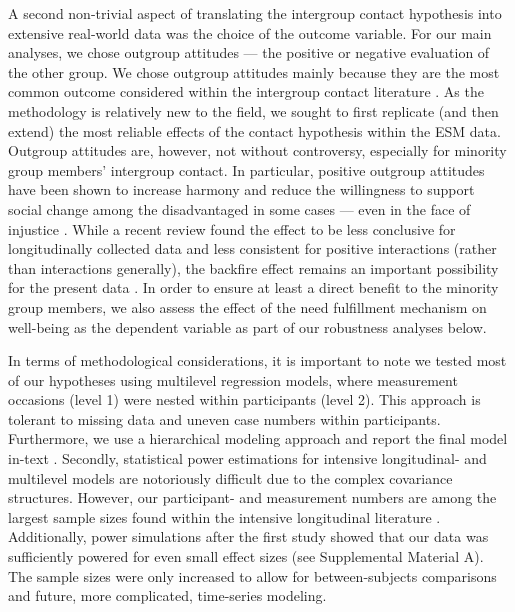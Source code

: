 \documentclass[man, 12pt, a4paper, mask]{apa7}
\theoremstyle{break}
\theoremstyle{plain}
\begin{document}
A second non-trivial aspect of translating the intergroup contact hypothesis into extensive real-world data was the choice of the outcome variable. For our main analyses, we chose outgroup attitudes --- the positive or negative evaluation of the other group. We chose outgroup attitudes mainly because they are the most common outcome considered within the intergroup contact literature \citep[e.g.,][]{Pettigrew2006, Paolini2021}. As the methodology is relatively new to the field, we sought to first replicate (and then extend) the most reliable effects of the contact hypothesis within the ESM data. Outgroup attitudes are, however, not without controversy, especially for minority group members' intergroup contact. In particular, positive outgroup attitudes have been shown to increase harmony and reduce the willingness to support social change among the disadvantaged in some cases --- even in the face of injustice \citep[e.g.,][]{dixon2012, saguy2009}. While a recent review found the effect to be less conclusive for longitudinally collected data and less consistent for positive interactions (rather than interactions generally), the backfire effect remains an important possibility for the present data \citep[see][]{reimer2023}. In order to ensure at least a direct benefit to the minority group members, we also assess the effect of the need fulfillment mechanism on well-being as the dependent variable as part of our robustness analyses below.

In terms of methodological considerations, it is important to note we tested most of our hypotheses using multilevel regression models, where measurement occasions (level 1) were nested within participants (level 2). This approach is tolerant to missing data and uneven case numbers within participants. Furthermore, we use a hierarchical modeling approach and report the final model in-text \citep[][; for the full modeling process see Supplementary Material A]{snijders2012}. Secondly, statistical power estimations for intensive longitudinal- and multilevel models are notoriously difficult due to the complex covariance structures. However, our participant- and measurement numbers are among the largest sample sizes found within the intensive longitudinal literature \citep[e.g.,][]{AanhetRot2012}. Additionally, power simulations after the first study showed that our data was sufficiently powered for even small effect sizes (see Supplemental Material A). The sample sizes were only increased to allow for between-subjects comparisons and future, more complicated, time-series modeling.
\end{document}
